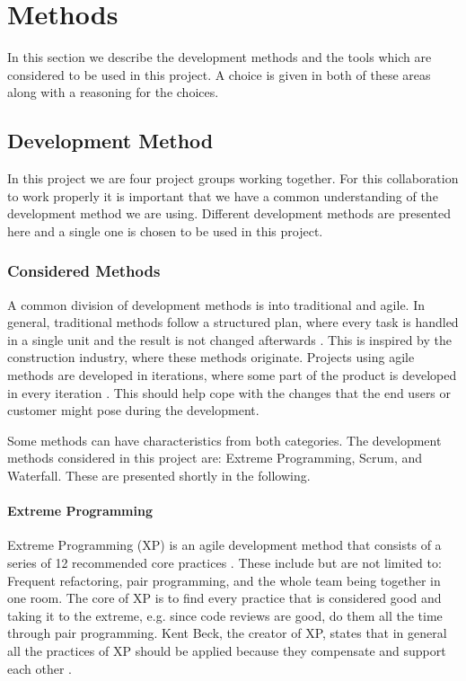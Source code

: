 \section{Methods}
In this section we describe the development methods and the tools which are considered to be used in this project.
A choice is given in both of these areas along with a reasoning for the choices.

\subsection{Development Method}
In this project we are four project groups working together.
For this collaboration to work properly it is important that we have a common understanding of the development method we are using.
Different development methods are presented here and a single one is chosen to be used in this project.

\subsubsection{Considered Methods}
A common division of development methods is into traditional and agile.
In general, traditional methods follow a structured plan, where every task is handled in a single unit and the result is not changed afterwards \cite[sec.~2.7]{Poppendieck00}.
This is inspired by the construction industry, where these methods originate.
Projects using agile methods are developed in iterations, where some part of the product is developed in every iteration \cite[p.~25]{Larman04}.
This should help cope with the changes that the end users or customer might pose during the development.

Some methods can have characteristics from both categories.
The development methods considered in this project are: Extreme Programming, Scrum, and Waterfall.
These are presented shortly in the following.

\paragraph{Extreme Programming}
Extreme Programming (XP) is an agile development method that consists of a series of 12 recommended core practices \cite[p.~137]{Larman04}.
These include but are not limited to: Frequent refactoring, pair programming, and the whole team being together in one room.
The core of XP is to find every practice that is considered good and taking it to the extreme, e.g. since code reviews are good, do them all the time through pair programming.
Kent Beck, the creator of XP, states that in general all the practices of XP should be applied because they compensate and support each other \cite[p.~156-157]{Larman04}.

